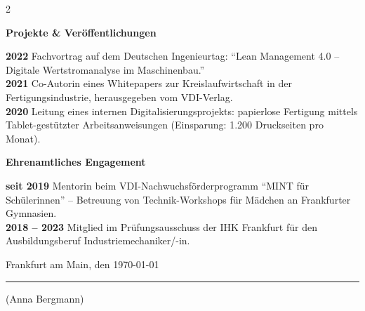 \documentclass[11pt,a4paper]{article}
\newcommand{\sectiontitle}[1]{%
  \begin{tcolorbox}[sectionbox]
    \textbf{\large\color{primary}#1}
  \end{tcolorbox}%
}
\begin{document}
\begin{paracol}{2}
  \sectiontitle{Projekte \& Veröffentlichungen}

  \textbf{2022} \hspace{0.4em} Fachvortrag auf dem Deutschen
    Ingenieurtag: \enquote{Lean Management 4.0 -- Digitale
    Wertstromanalyse im Maschinenbau.}\\[0.3em]
  \textbf{2021} \hspace{0.4em} Co-Autorin eines Whitepapers zur
    Kreislaufwirtschaft in der Fertigungsindustrie,
    herausgegeben vom VDI-Verlag.\\[0.3em]
  \textbf{2020} \hspace{0.4em} Leitung eines internen
    Digitalisierungsprojekts: papierlose Fertigung mittels
    Tablet-gestützter Arbeitsanweisungen (Einsparung: 1.200
    Druckseiten pro Monat).\\[0.3em]

  \sectiontitle{Ehrenamtliches Engagement}

  \textbf{seit 2019} \hspace{0.4em} Mentorin beim VDI-Nachwuchsförderprogramm
    \enquote{MINT für Schülerinnen} -- Betreuung von
    Technik-Workshops für Mädchen an Frankfurter Gymnasien.\\[0.3em]
  \textbf{2018 -- 2023} \hspace{0.4em} Mitglied im Prüfungsausschuss der
    IHK Frankfurt für den Ausbildungsberuf
    Industriemechaniker/-in.

\end{paracol}

\vspace{1.2em}
\small\color{graytext}
Frankfurt am Main, den \today \hspace{2em} \rule{4cm}{0.4pt}\hspace{1em}
(Anna Bergmann)
\end{document}
